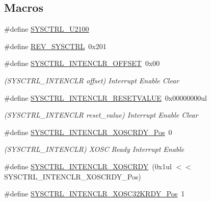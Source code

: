 \subsection*{Macros}
\begin{DoxyCompactItemize}
\item 
\#define \mbox{\hyperlink{group___s_a_m_d21___s_y_s_c_t_r_l_ga392cb4aa0b012283ad172f6be32402c1}{S\+Y\+S\+C\+T\+R\+L\+\_\+\+U2100}}
\item 
\#define \mbox{\hyperlink{group___s_a_m_d21___s_y_s_c_t_r_l_ga8cd67b2986f7d8c779b019592e5276a5}{R\+E\+V\+\_\+\+S\+Y\+S\+C\+T\+RL}}~0x201
\item 
\#define \mbox{\hyperlink{group___s_a_m_d21___s_y_s_c_t_r_l_ga102cd45398f2ea6bef4df64fd6a5c4c8}{S\+Y\+S\+C\+T\+R\+L\+\_\+\+I\+N\+T\+E\+N\+C\+L\+R\+\_\+\+O\+F\+F\+S\+ET}}~0x00
\begin{DoxyCompactList}\small\item\em (S\+Y\+S\+C\+T\+R\+L\+\_\+\+I\+N\+T\+E\+N\+C\+LR offset) Interrupt Enable Clear \end{DoxyCompactList}\item 
\#define \mbox{\hyperlink{group___s_a_m_d21___s_y_s_c_t_r_l_gaadf029c437bb49ee35d899079b8932b5}{S\+Y\+S\+C\+T\+R\+L\+\_\+\+I\+N\+T\+E\+N\+C\+L\+R\+\_\+\+R\+E\+S\+E\+T\+V\+A\+L\+UE}}~0x00000000ul
\begin{DoxyCompactList}\small\item\em (S\+Y\+S\+C\+T\+R\+L\+\_\+\+I\+N\+T\+E\+N\+C\+LR reset\+\_\+value) Interrupt Enable Clear \end{DoxyCompactList}\item 
\#define \mbox{\hyperlink{group___s_a_m_d21___s_y_s_c_t_r_l_ga3eacca594d459b91cede5a1ebf4bdb0b}{S\+Y\+S\+C\+T\+R\+L\+\_\+\+I\+N\+T\+E\+N\+C\+L\+R\+\_\+\+X\+O\+S\+C\+R\+D\+Y\+\_\+\+Pos}}~0
\begin{DoxyCompactList}\small\item\em (S\+Y\+S\+C\+T\+R\+L\+\_\+\+I\+N\+T\+E\+N\+C\+LR) X\+O\+SC Ready Interrupt Enable \end{DoxyCompactList}\item 
\#define \mbox{\hyperlink{group___s_a_m_d21___s_y_s_c_t_r_l_ga0cb58bce7865bb379297fe1852921f6a}{S\+Y\+S\+C\+T\+R\+L\+\_\+\+I\+N\+T\+E\+N\+C\+L\+R\+\_\+\+X\+O\+S\+C\+R\+DY}}~(0x1ul $<$$<$ S\+Y\+S\+C\+T\+R\+L\+\_\+\+I\+N\+T\+E\+N\+C\+L\+R\+\_\+\+X\+O\+S\+C\+R\+D\+Y\+\_\+\+Pos)
\item 
\#define \mbox{\hyperlink{group___s_a_m_d21___s_y_s_c_t_r_l_ga297e45d851ce581361ee8a30ff7db8b6}{S\+Y\+S\+C\+T\+R\+L\+\_\+\+I\+N\+T\+E\+N\+C\+L\+R\+\_\+\+X\+O\+S\+C32\+K\+R\+D\+Y\+\_\+\+Pos}}~1
$$
\end{DoxyCompactItemize}
